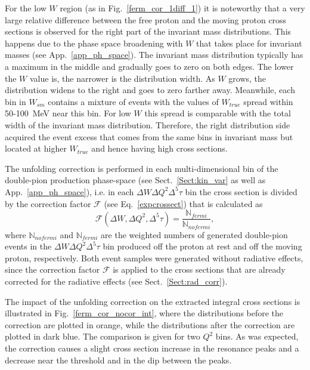 For the low $W$ region (as in Fig.~\ref{ferm_cor_1diff_1}) it is noteworthy that a very large relative difference between the free proton and the moving proton cross sections is observed for the right part of the invariant mass distributions. This happens due to the phase space broadening with $W$ that takes place for invariant masses (see App.~\ref{app_ph_space}). The invariant mass distribution typically has a maximum in the middle and gradually goes to zero on both edges. The lower the $W$ value is, the narrower is the distribution width. As $W$ grows, the distribution widens to the right and goes to zero farther away. Meanwhile, each bin in $W_{sm}$ contains a mixture of events with the values of $W_{true}$ spread within 50-100~MeV near this bin. For low $W$ this spread is comparable with the total  width of the invariant mass distribution. Therefore, the right distribution side acquired the event excess that comes from the same bins in invariant mass but located at higher $W_{true}$ and hence having high cross sections.


The unfolding correction is performed in each multi-dimensional bin of the double-pion production phase-space (see Sect.~\ref{Sect:kin_var} as well as App.~\ref{app_ph_space}), i.e. in each $\Delta W \Delta Q^{2}\Delta^{5}\tau$ bin the cross section is divided by the correction factor $\mathcal{F}$ (see  Eq.~\eqref{expcrossect}) that is calculated as
\begin{equation}
\mathcal{F}(\Delta W, \Delta Q^{2},\Delta^{5}\tau) = \frac{\mathbb{N}_{fermi}}{\mathbb{N}_{nofermi}},
\label{eq:ferm_corr}
\end{equation}
where $\mathbb{N}_{nofermi}$ and $\mathbb{N}_{fermi}$ are the weighted numbers of generated double-pion events in the $\Delta W \Delta Q^{2}\Delta^{5}\tau$ bin produced off the proton at rest and off the moving proton, respectively. Both event samples were generated without radiative effects, since the correction factor $\mathcal{F}$ is applied to the cross sections that are already corrected for the radiative effects (see Sect.~\ref{Sect:rad_corr}).


The impact of the unfolding correction on the extracted integral cross sections is illustrated in Fig.~\ref{ferm_cor_nocor_int}, where the distributions before the correction are plotted in orange, while the distributions after the correction are plotted in dark blue. The comparison is given for two $Q^{2}$ bins. As was expected, the correction causes a slight cross section increase in the resonance peaks and a decrease near the threshold and in the dip between the peaks. 

